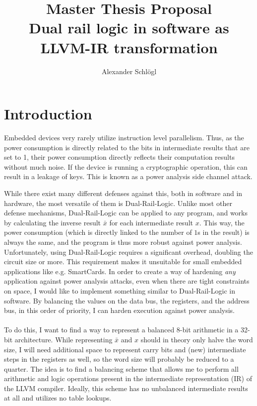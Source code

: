 \documentclass{article}
\title{%
  Master Thesis Proposal\\
  \large Dual rail logic in software as LLVM-IR transformation}
\author{Alexander Schl\"ogl}
\newcommand{\dual}{Dual-Rail-Logic}
\newcommand{\llvm}{LLVM}
\begin{document}
\maketitle

\section{Introduction}
Embedded devices very rarely utilize instruction level parallelism.
Thus, as the power consumption is directly related to the bits in intermediate results that are set to 1, their power consumption directly reflects their computation results without much noise.
If the device is running a cryptographic operation, this can result in a leakage of keys.
This is known as a power analysis side channel attack\cite{kocher1999differential}.

While there exist many different defenses against this, both in software and in hardware, the most versatile of them is \dual{}\cite{sokolov2005design}.
Unlike most other defense mechanisms, \dual{} can be applied to any program, and works by calculating the inverse result $\bar{x}$ for each intermediate result $x$.
This way, the power consumption (which is directly linked to the number of $1$s in the result) is always the same, and the program is thus more robust against power analysis.
Unfortunately, using \dual{} requires a significant overhead, doubling the circuit size or more\cite{baddam2008path}.
This requirement makes it unsuitable for small embedded applications like e.g. SmartCards.
In order to create a way of hardening \emph{any} application against power analysis attacks, even when there are tight constraints on space, I would like to implement something similar to \dual{} in software.
By balancing the values on the data bus, the registers, and the address bus, in this order of priority, I can harden execution against power analysis.
\\
\\
To do this, I want to find a way to represent a balanced 8-bit arithmetic in a 32-bit architecture.
While representing $\bar{x}$ and $x$ should in theory only halve the word size, I will need additional space to represent carry bits and (new) intermediate steps in the registers as well, so the word size will probably be reduced to a quarter.
The idea is to find a balancing scheme that allows me to perform all arithmetic and logic operations present in the intermediate representation (IR) of the \llvm{} compiler.
Ideally, this scheme has no unbalanced intermediate results at all and utilizes no table lookups.
\end{document}

